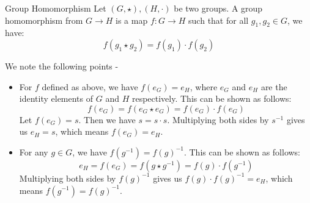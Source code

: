 \documentclass[openany]{book}
\begin{document}
\begin{mydefinition}{Group Homomorphism}
    Let $(G, \star), (H, \cdot)$ be two groups. A group homomorphism from $G \to H$ is a map $f: G \to H$ such that for all $g_1, g_2 \in G$, we have:
    \[f(g_1 \star g_2) = f(g_1) \cdot f(g_2)\]
\end{mydefinition}
\begin{mynote}
    We note the following points - 
    \begin{itemize}
        \item For $f$ defined as above, we have $f(e_G) = e_H$, where $e_G$ and $e_H$ are the identity elements of $G$ and $H$ respectively. This can be shown as follows:
        \[f(e_G) = f(e_G \star e_G) = f(e_G) \cdot f(e_G)\]
        Let $f(e_G) = s$. Then we have $s = s \cdot s$. Multiplying both sides by $s^{-1}$ gives us $e_H = s$, which means $f(e_G) = e_H$.
        \item For any $g \in G$, we have $f(g^{-1}) = f(g)^{-1}$. This can be shown as follows:
        \[e_H = f(e_G) = f(g \star g^{-1}) = f(g) \cdot f(g^{-1})\]
        Multiplying both sides by $f(g)^{-1}$ gives us $f(g) \cdot f(g)^{-1} = e_H$, which means $f(g^{-1}) = f(g)^{-1}$.
    \end{itemize}
\end{mynote}
\end{document}
